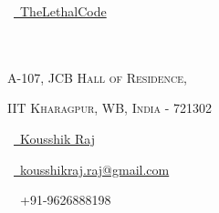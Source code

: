 \documentclass[a4paper,10pt]{extarticle} %
\begin{document}
\pagestyle{empty} %

\begin{multicols}{3}
\normalsize \faGithub\ {\href{https://github.com/TheLethalCode}{\  TheLethalCode}}\\
\normalsize {}\\
\normalsize {}\\
\columnbreak
\normalsize\par{\par} %
\par{\centering\normalsize {\textsc{A-107, JCB Hall of Residence, }}\hfill\par}
\vspace{-0.2cm}
\par{\centering\normalsize {\textsc{IIT Kharagpur, WB, India - 721302 }}\hfill\par}

\columnbreak
\raggedright\hfill\normalsize  \faLinkedinSquare\ {\href{https://www.linkedin.com/in/kousshik-raj-murali-b3976916a/}{\  Kousshik Raj}}\\
\raggedright\hfill\normalsize \faEnvelope\ {\href{mailto:kousshikraj.raj@gmail.com}{\  kousshikraj.raj@gmail.com}}\\
\raggedright\hfill{\faPhone\ \  +91-9626888198}
\end{multicols}


\vspace{-0.75cm}
\end{document}
